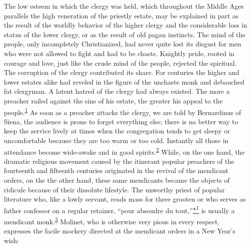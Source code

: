 \protect\hypertarget{14_Chapter_Seven__THE_PIOUS_PERSONA.xhtmlux5cux23page_204}{}{}The
low esteem in which the clergy was held, which throughout the Middle
Ages parallels the high veneration of the priestly estate, may be
explained in part as the result of the worldly behavior of the higher
clergy and the considerable loss in status of the lower clergy, or as
the result of old pagan instincts. The mind of the people, only
incompletely Christianized, had never quite lost its disgust for men who
were not allowed to fight and had to be chaste. Knightly pride, rooted
in courage and love, just like the crude mind of the people, rejected
the spiritual. The corruption of the clergy contributed its share. For
centuries the higher and lower estates alike had reveled in the figure
of the unchaste monk and debauched fat clergyman. A latent hatred of the
clergy had always existed. The more a preacher railed against the sins
of his estate, the greater his appeal to the
people.\textsuperscript{\protect\hypertarget{14_Chapter_Seven__THE_PIOUS_PERSONA.xhtmlux5cux23id_1021}{\protect\hyperlink{23_NOTES.xhtmlux5cux23id_1022}{1}}}
As soon as a preacher attacks the clergy, we are told by Bernardinus of
Siena, the audience is prone to forget everything else; there is no
better way to keep the service lively at times when the congregation
tends to get sleepy or uncomfortable because they are too warm or too
cold. Instantly all those in attendance become wide-awake and in good
spirits.\textsuperscript{\protect\hypertarget{14_Chapter_Seven__THE_PIOUS_PERSONA.xhtmlux5cux23id_1019}{\protect\hyperlink{23_NOTES.xhtmlux5cux23id_1020}{2}}}
While, on the one hand, the dramatic religious movement caused by the
itinerant popular preachers of the fourteenth and fifteenth centuries
originated in the revival of the mendicant orders, on the the other
hand, these same mendicants became the objects of ridicule because of
their dissolute lifestyle. The unworthy priest of popular literature
who, like a lowly servant, reads mass for three grooten or who serves as
father confessor on a regular retainer, ``pour absoudre du
tout,''\protect\hypertarget{14_Chapter_Seven__THE_PIOUS_PERSONA.xhtmlux5cux23id_3077}{\protect\hyperlink{23_NOTES.xhtmlux5cux23id_3078}{*\textsuperscript{1}}}
is usually a mendicant
monk.\textsuperscript{\protect\hypertarget{14_Chapter_Seven__THE_PIOUS_PERSONA.xhtmlux5cux23id_1017}{\protect\hyperlink{23_NOTES.xhtmlux5cux23id_1018}{3}}}
Molinet, who is otherwise very pious in every respect, expresses the
facile mockery directed at the mendicant orders in a New Year's wish:

